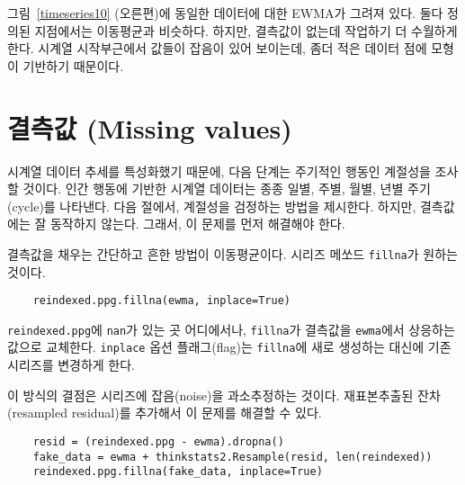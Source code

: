 그림~\ref{timeseries10} (오른편)에 동일한 데이터에 대한 EWMA가 그려져 있다. 둘다 정의된 지점에서는 이동평균과 비슷하다. 하지만, 결측값이 없는데 작업하기 더 수월하게 한다. 시계열 시작부근에서 값들이 잡음이 있어 보이는데, 좀더 적은 데이터 점에 모형이 기반하기 때문이다.


\section{결측값 (Missing values)}

시계열 데이터 추세를 특성화했기 때문에, 다음 단계는 주기적인 행동인 계절성을 조사할 것이다. 인간 행동에 기반한 시계열 데이터는 종종 일별, 주별, 월별, 년별 주기(cycle)를 나타낸다. 다음 절에서, 계절성을 검정하는 방법을 제시한다. 하지만, 결측값에는 잘 동작하지 않는다. 그래서, 이 문제를 먼저 해결해야 한다.


결측값을 채우는 간단하고 흔한 방법이 이동평균이다.
시리즈 메쏘드 {\tt fillna}가 원하는 것이다.


\begin{verbatim}
    reindexed.ppg.fillna(ewma, inplace=True)
\end{verbatim}

{\tt reindexed.ppg}에 {\tt nan}가 있는 곳 어디에서나, {\tt fillna}가 결측값을 {\tt ewma}에서 상응하는 값으로 교체한다. {\tt inplace} 옵션 플래그(flag)는 {\tt fillna}에 새로 생성하는 대신에 기존 시리즈를 변경하게 한다.

이 방식의 결점은 시리즈에 잡음(noise)을 과소추정하는 것이다. 재표본추출된 잔차(resampled residual)를 추가해서 이 문제를 해결할 수 있다.


\begin{verbatim}
    resid = (reindexed.ppg - ewma).dropna()
    fake_data = ewma + thinkstats2.Resample(resid, len(reindexed))
    reindexed.ppg.fillna(fake_data, inplace=True)
\end{verbatim}


